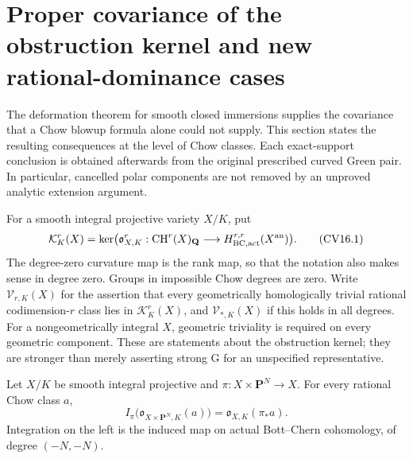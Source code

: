 \section{Proper covariance of the obstruction kernel and new rational-dominance cases}
\label{r16cov:section}

The deformation theorem for smooth closed immersions supplies the
covariance that a Chow blowup formula alone could not supply.
This section states the resulting consequences at the level of
Chow classes.  Each exact-support conclusion is obtained afterwards
from the original prescribed curved Green pair.  In particular,
cancelled polar components are not removed by an unproved analytic
extension argument.

\begin{definition}
\label{r16cov:definition}
For a smooth integral projective variety $X/K$, put
\[
 \mathcal K_K^r(X)=\ker\bigl(\mathfrak o_{X,K}^r:
       \operatorname{CH}^r(X)_{\mathbf Q}
              \longrightarrow H_{\mathrm{BC,act}}^{r,r}(X^{\rm an})\bigr).
 \tag{CV16.1}\label{r16cov:kernel}
\]
The degree-zero curvature map is the rank map, so that the notation
also makes sense in degree zero.  Groups in impossible Chow degrees
are zero.  Write $\mathcal V_{r,K}(X)$ for the assertion that every
geometrically homologically trivial rational codimension-$r$ class
lies in $\mathcal K_K^r(X)$, and $\mathcal V_{*,K}(X)$ if this holds
in all degrees.  For a nongeometrically integral $X$, geometric
triviality is required on every geometric component.  These are
statements about the obstruction kernel; they are stronger than
merely asserting strong G for an unspecified representative.
\end{definition}

\begin{lemma}
\label{r16cov:projective-push}
Let $X/K$ be smooth integral projective and
$\pi:X\times\mathbf P^N\to X$.  For every rational Chow class $a$,
\[
 I_\pi\bigl(\mathfrak o_{X\times\mathbf P^N,K}(a)\bigr)
                  =\mathfrak o_{X,K}(\pi_*a).
 \tag{CV16.2}\label{r16cov:projective-compatibility}
\]
Integration on the left is the induced map on actual Bott--Chern
cohomology, of degree $(-N,-N)$.
\end{lemma}

